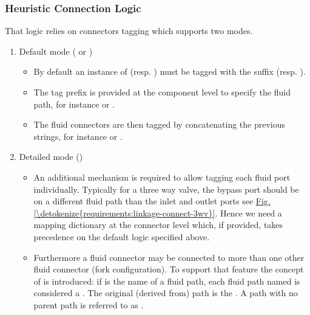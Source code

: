 \documentclass[letterpaper,10pt, openany,english]{sphinxmanual}
\begin{document}
\subsubsection{Heuristic Connection Logic}
\label{\detokenize{requirements:heuristic-connection-logic}}\label{\detokenize{requirements:sec-heuristic}}
That logic relies on connectors tagging which supports two modes.
\begin{enumerate}
%
\item {} 
Default mode ( or )
\begin{itemize}
\item {} 
By default an instance of  (resp. ) must be tagged with the suffix  (resp. ).

\item {} 
The tag prefix is provided at the component level to specify the fluid path, for instance  or .

\item {} 
The fluid connectors are then tagged by concatenating the previous strings, for instance  or .

\end{itemize}

\item {} 
Detailed mode ()
\begin{itemize}
\item {} 
An additional mechanism is required to allow tagging each fluid port individually. Typically for a three way valve, the bypass port should be on a different fluid path than the inlet and outlet ports see \hyperref[\detokenize{requirements:linkage-connect-3wv}]{Fig.\@ \ref{\detokenize{requirements:linkage-connect-3wv}}}. Hence we need a mapping dictionary at the connector level which, if provided, takes precedence on the default logic specified above.

\item {} 
Furthermore a fluid connector may be connected to more than one other fluid connector (fork configuration). To support that feature the concept of  is introduced: if  is the name of a fluid path, each fluid path named  is considered a . The original (derived from) path is the . A path with no parent path is referred to as .


\end{itemize}
\end{enumerate}
\end{document}
